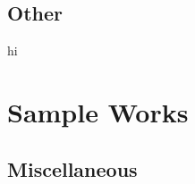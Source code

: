 \documentclass[letterpaper,twoside]{report}
\begin{document}
%
%

\chapter{Other}
hi

\part{Sample Works}



\chapter{Miscellaneous}

\clearpage
\layout{}
\end{document}

